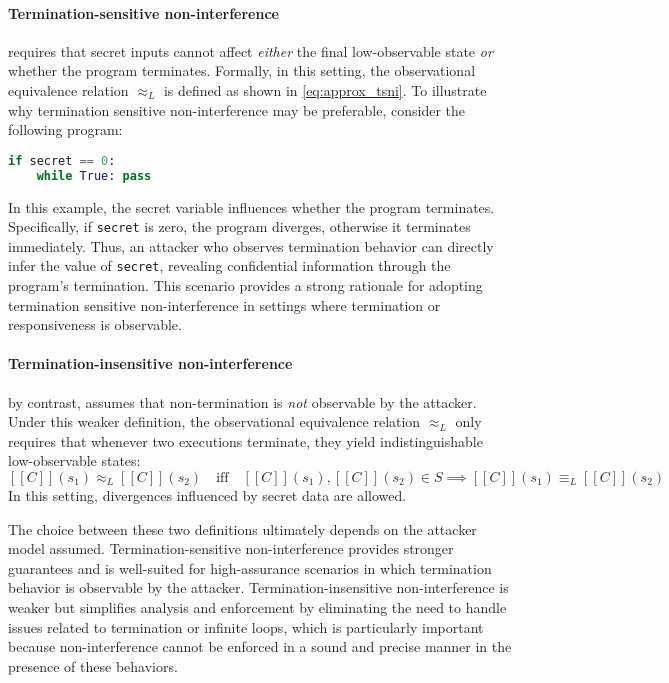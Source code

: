 \documentclass[12pt,a4paper,twoside]{book}
\newcommand{\llbracket}{[\![}
\newcommand{\rrbracket}{]\!]}
\begin{document}
\paragraph{Termination-sensitive non-interference} requires that secret inputs cannot affect \emph{either} the final low-observable state \emph{or} whether the program terminates\cite{volpano1997eliminating}. Formally, in this setting, the observational equivalence relation $\approx_L$ is defined as shown in \ref{eq:approx_tsni}. To illustrate why termination sensitive non-interference may be preferable, consider the following program:
\begin{lstlisting}[language=Python]
if secret == 0:
    while True: pass
\end{lstlisting}
In this example, the secret variable influences whether the program terminates. Specifically, if \lstinline|secret| is zero, the program diverges, otherwise it terminates immediately. Thus, an attacker who observes termination behavior can directly infer the value of \lstinline|secret|, revealing confidential information through the program's termination. This scenario provides a strong rationale for adopting termination sensitive non-interference in settings where termination or responsiveness is observable.

\paragraph{Termination-insensitive non-interference} by contrast, assumes that non-ter\-mi\-na\-tion is \emph{not} observable by the attacker\cite{goguen1982security}. 
Under this weaker definition, the observational equivalence relation $\approx_L$ only requires that whenever two executions terminate, they yield indistinguishable low-observable states\cite{volpano1996sound}:
\[
\llbracket C \rrbracket(s_1) \approx_L \llbracket C \rrbracket(s_2)
\quad\text{iff}\quad
\llbracket C \rrbracket(s_1), \llbracket C \rrbracket(s_2) \in S \implies
\llbracket C \rrbracket(s_1) \equiv_L \llbracket C \rrbracket(s_2)
\]
In this setting, divergences influenced by secret data are allowed.

The choice between these two definitions ultimately depends on the attacker model assumed. Termination-sensitive non-interference provides stronger guarantees and is well-suited for high-assurance scenarios in which termination behavior is observable by the attacker.
Termination-insensitive non-interference is weaker but simplifies analysis and enforcement by eliminating the need to handle issues related to termination or infinite loops, which is particularly important because non-interference cannot be enforced in a sound and precise manner in the presence of these behaviors\cite{ngo2018impossibility}.
\end{document}
